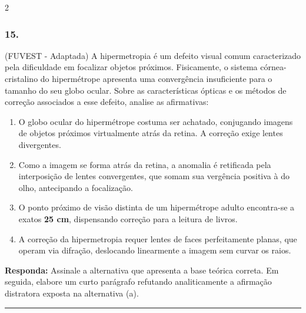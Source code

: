 \documentclass[twoside, 10pt, a4paper]{article}
\newlength{\espacoPreQuestao}\setlength{\espacoPreQuestao}{0.1cm}
\newlength{\espacoQuestao}\setlength{\espacoQuestao}{0.2cm}
\newlength{\espacoAlt}\setlength{\espacoAlt}{0.2cm}
\begin{document}
\begin{multicols*}{2}
\subsubsection*{15.} (FUVEST - Adaptada) A hipermetropia é um defeito visual comum caracterizado pela dificuldade em focalizar objetos próximos. Fisicamente, o sistema córnea-cristalino do hipermétrope apresenta uma convergência insuficiente para o tamanho do seu globo ocular. Sobre as características ópticas e os métodos de correção associados a esse defeito, analise as afirmativas:
\begin{enumerate}[label=\alph*), itemsep=\espacoAlt]
\item O globo ocular do hipermétrope costuma ser achatado, conjugando imagens de objetos próximos virtualmente atrás da retina. A correção exige lentes divergentes.
\item Como a imagem se forma atrás da retina, a anomalia é retificada pela interposição de lentes convergentes, que somam sua vergência positiva à do olho, antecipando a focalização.
\item O ponto próximo de visão distinta de um hipermétrope adulto encontra-se a exatos \textbf{25 cm}, dispensando correção para a leitura de livros.
\item A correção da hipermetropia requer lentes de faces perfeitamente planas, que operam via difração, deslocando linearmente a imagem sem curvar os raios.
\end{enumerate}
\begin{boxresponda}
\textbf{Responda:} Assinale a alternativa que apresenta a base teórica correta. Em seguida, elabore um curto parágrafo refutando analiticamente a afirmação distratora exposta na alternativa (a).
\end{boxresponda}
\par\vspace{\espacoQuestao}

\noindent\textcolor{CorLinha}{\rule{\linewidth}{0.5pt}} 
\par\vspace{\espacoPreQuestao}

\end{multicols*}
\end{document}
